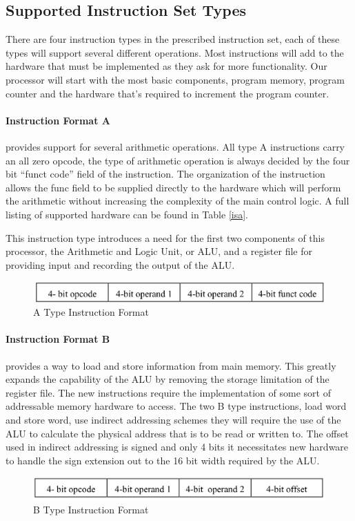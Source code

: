     \subsection{Supported Instruction Set Types}
    There are four instruction types in the prescribed instruction set, each of these types will support several 
    different operations. Most instructions will add to the hardware that must be implemented as they ask for more
    functionality. Our processor will start with the most basic components, program memory, program counter and the 
    hardware that's required to increment the program counter.

        \paragraph*{Instruction Format A}
        provides support for several arithmetic operations. All type A instructions carry an
        all zero opcode, the type of arithmetic operation is always decided by the four bit ``funct code'' field
        of the instruction. The organization of the instruction allows the func field to be supplied directly to
        the hardware which will perform the arithmetic without increasing the complexity of the main control logic.
        A full listing of supported hardware can be found in Table \ref{isa}.

        This instruction type introduces a need for the first two components of this processor, the Arithmetic and
        Logic Unit, or ALU, and a register file for providing input and recording the output of the ALU. 
        \begin{figure}[htpb]
            \includegraphics[width=.48\textwidth]{./figures/atype.jpg}
            \caption{A Type Instruction Format}
            \label{instructiontypes}
        \end{figure}

        \paragraph*{Instruction Format B}
        provides a way to load and store information from main memory. This greatly expands the capability of the
        ALU by removing the storage limitation of the register file. The new instructions require the implementation
        of some sort of addressable memory hardware to access. The two B type instructions, load word and
        store word, use indirect addressing schemes they will require the use of the ALU to calculate the physical
        address that is to be read or written to. The offset used in indirect addressing is signed and only
        4 bits it necessitates new hardware to handle the sign extension out to the 16 bit width required by the ALU.
        \begin{figure}[htpb]
            \includegraphics[width=.48\textwidth]{./figures/btype.jpg}
            \caption{B Type Instruction Format}
        \end{figure}

